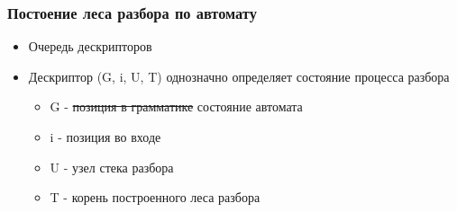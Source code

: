 \documentclass{beamer}
\begin{document}
\begin{frame} 
	\frametitle{Постоение леса разбора по автомату}
	\begin{itemize}
		\item Очередь дескрипторов
		\item Дескриптор (G, i, U, T) однозначно определяет состояние процесса разбора
		\begin{itemize}
			\item G - \sout{позиция в грамматике} состояние автомата
			\item i - позиция во входе
			\item U - узел стека разбора
			\item T - корень построенного леса разбора
		\end{itemize}
	\end{itemize}
\end{frame}
\end{document}
